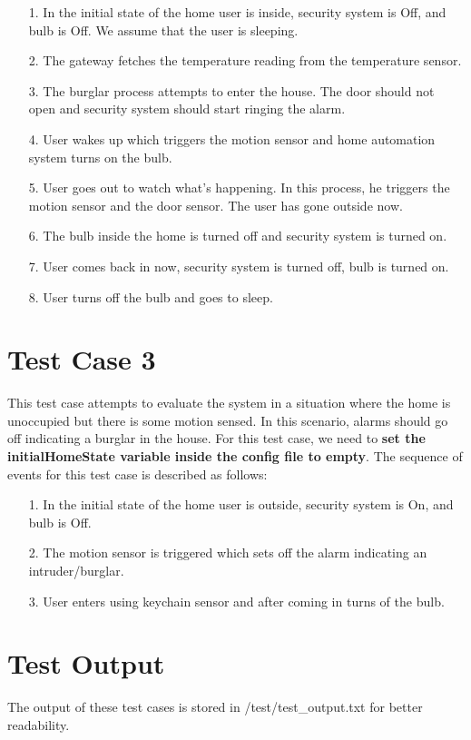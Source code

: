 \documentclass[12pt]{article}
\begin{document}
\begin{itemize}
	\item[1.] In the initial state of the home user is inside, security system is Off, and bulb is Off. We assume that the user is sleeping.
	
	\item[2.] The gateway fetches the temperature reading from the temperature sensor. 
	
	\item[3.] The burglar process attempts to enter the house. The door should not open and security system should start ringing the alarm. 
	
	\item[4.] User wakes up which triggers the motion sensor and home automation
	system turns on the bulb.
	
	\item[5.] User goes out to watch what's happening. In this process, he triggers the motion 
	sensor and the door sensor. The user has gone outside now. 
	
	\item[6.] The bulb inside the home is turned off and security system is turned on. 
	
	\item[7.] User comes back in now, security system is turned off, bulb is turned on. 
	
	\item[8.] User turns off the bulb and goes to sleep. 
	
\end{itemize}

\section{Test Case 3}

This test case attempts to evaluate the system in a situation where the home is unoccupied
but there is some motion sensed. In this scenario, alarms should go off indicating a burglar in the house. For this test case, we need to \textbf{set the initialHomeState variable inside the config file to empty}. The sequence of events for this test case is described as follows:

\begin{itemize}
	\item[1.] In the initial state of the home user is outside, security system is On, and bulb is Off.
	
	\item[2.] The motion sensor is triggered which sets off the alarm indicating an intruder/burglar.
	
	\item[3.] User enters using keychain sensor and after coming in turns of the bulb.
\end{itemize}

\section{Test Output}

The output of these test cases is stored in /test/test\_output.txt for better readability. 
\end{document}
